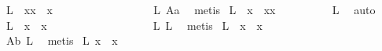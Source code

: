 \begin{isabellebody}
\isamarkupfalse%
\ L{}{\isacharcolon}\ \ {\isachardoublequoteopen}{\isasymbox}{\isacharparenleft}{\isacharparenleft}{\isasymbox}{\isasymbox}x{\isacharparenright}{\isasymcdot}x{\isacharparenright}\ {\isasymapprox}\ {\isasymbox}{\isasymbox}x{\isachardoublequoteclose}%
\isadelimproof
\ \ \ \ \ \ \ \ \ \ \ \ \ \ \ \ %
\endisadelimproof
%
\isatagproof
{}\isamarkupfalse%
\ L{}\ A{}a\ \isamarkupfalse%
\ metis%
\endisatagproof
{\isafoldproof}%
%
\isadelimproof
%
\endisadelimproof
\isanewline
{}\isamarkupfalse%
\ L{}{\isacharcolon}\ \ {\isachardoublequoteopen}{\isasymbox}{\isasymbox}{\isacharparenleft}x{\isasymbox}{\isacharparenright}\ {\isasymapprox}\ {\isasymbox}{\isacharparenleft}{\isasymbox}{\isasymbox}{\isacharparenleft}x{\isasymbox}{\isacharparenright}{\isacharparenright}{\isasymcdot}{\isacharparenleft}x{\isasymbox}{\isacharparenright}{\isachardoublequoteclose}%
\isadelimproof
\ \ \ \ \ \ \ \ %
\endisadelimproof
%
\isatagproof
{}\isamarkupfalse%
\ L{}\ \isamarkupfalse%
\ auto%
\endisatagproof
{\isafoldproof}%
%
\isadelimproof
%
\endisadelimproof
\isanewline
{}\isamarkupfalse%
\ L{}{\isacharcolon}\ \ {\isachardoublequoteopen}{\isasymbox}{\isasymbox}{\isacharparenleft}x{\isasymbox}{\isacharparenright}\ {\isasymapprox}\ {\isasymbox}{\isacharparenleft}x{\isasymbox}{\isacharparenright}{\isachardoublequoteclose}%
\isadelimproof
\ \ \ \ \ \ \ \ \ \ \ \ \ \ \ \ \ %
\endisadelimproof
%
\isatagproof
{}\isamarkupfalse%
\ L{}\ L{}\ \isamarkupfalse%
\ metis%
\endisatagproof
{\isafoldproof}%
%
\isadelimproof
%
\endisadelimproof
\isanewline
{}\isamarkupfalse%
\ L{}{\isacharcolon}\ \ {\isachardoublequoteopen}{\isasymbox}{\isasymbox}{\isacharparenleft}x{\isasymbox}{\isacharparenright}\ {\isasymapprox}\ {\isasymbox}x{\isachardoublequoteclose}%
\isadelimproof
\ \ \ \ \ \ \ \ \ \ \ \ \ \ \ \ \ \ \ \ \ %
\endisadelimproof
%
\isatagproof
{}\isamarkupfalse%
\ A{}b\ L{}\ \isamarkupfalse%
\ metis%
\endisatagproof
{\isafoldproof}%
%
\isadelimproof
%
\endisadelimproof
\isanewline
{}\isamarkupfalse%
\ L{}{}{\isacharcolon}\ {\isachardoublequoteopen}{\isasymbox}{\isasymbox}x\ {\isasymapprox}\ {\isasymbox}x{\isachardoublequoteclose}%
\isadelimproof
\ \ \ \ \ \ \ \ \ \ \ \ \ \ \ \ \ \ \ \ \ \ \ \ %
\endisadelimproof
%
\isatagproof
{}\isamarkupfalse%

\end{isabellebody}
